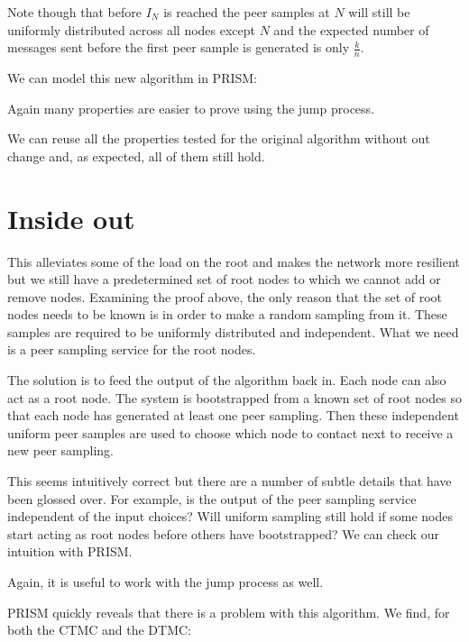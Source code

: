 \documentclass[a4paper,10pt]{article}
\newcommand{\prismmodel}[1]{
  \begin{quotation}
  \footnotesize
  
  \end{quotation}
}
\begin{document}
Note though that before $I_N$ is reached the peer samples at $N$ will still be uniformly distributed across all nodes except $N$ and the expected number of messages sent before the first peer sample is generated is only $\frac{k}{n}$.

We can model this new algorithm in PRISM:

\prismmodel{ctmc_multiple}

Again many properties are easier to prove using the jump process.

\prismmodel{dtmc_multiple}

We can reuse all the properties tested for the original algorithm without out change and, as expected, all of them still hold.

\section{Inside out}

This alleviates some of the load on the root and makes the network more resilient but we still have a predetermined set of root nodes to which we cannot add or remove nodes. Examining the proof above, the only reason that the set of root nodes needs to be known is in order to make a random sampling from it. These samples are required to be uniformly distributed and independent. What we need is a peer sampling service for the root nodes.

The solution is to feed the output of the algorithm back in. Each node can also act as a root node. The system is bootstrapped from a known set of root nodes so that each node has generated at least one peer sampling. Then these independent uniform peer samples are used to choose which node to contact next to receive a new peer sampling.

This seems intuitively correct but there are a number of subtle details that have been glossed over. For example, is the output of the peer sampling service independent of the input choices? Will uniform sampling still hold if some nodes start acting as root nodes before others have bootstrapped? We can check our intuition with PRISM.

\prismmodel{ctmc_broken}

Again, it is useful to work with the jump process as well.

\prismmodel{dtmc_broken}

PRISM quickly reveals that there is a problem with this algorithm. We find, for both the CTMC and the DTMC:
\end{document}
